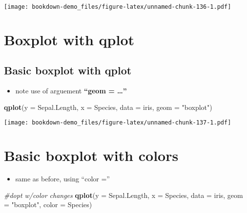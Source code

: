 \documentclass[]{book}
\newenvironment{Shaded}{\begin{snugshade}}{\end{snugshade}}
\newcommand{\KeywordTok}[1]{\textcolor[rgb]{0.13,0.29,0.53}{\textbf{#1}}}
\newcommand{\DataTypeTok}[1]{\textcolor[rgb]{0.13,0.29,0.53}{#1}}
\newcommand{\StringTok}[1]{\textcolor[rgb]{0.31,0.60,0.02}{#1}}
\newcommand{\CommentTok}[1]{\textcolor[rgb]{0.56,0.35,0.01}{\textit{#1}}}
\newcommand{\NormalTok}[1]{#1}
\providecommand{\tightlist}{%
  \setlength{\itemsep}{0pt}\setlength{\parskip}{0pt}}
\theoremstyle{definition}
\theoremstyle{definition}
\theoremstyle{definition}
\theoremstyle{remark}
\begin{document}
\texttt{[image: bookdown-demo\_files/figure-latex/unnamed-chunk-136-1.pdf]}

\section{Boxplot with qplot}\label{boxplot-with-qplot}

\subsection{Basic boxplot with qplot}\label{basic-boxplot-with-qplot}

\begin{itemize}
\tightlist
\item
  note use of arguement \textbf{``geom = \ldots{}''}
\end{itemize}

\begin{Shaded}
\begin{Highlighting}[]
\KeywordTok{qplot}\NormalTok{(}\DataTypeTok{y =}\NormalTok{ Sepal.Length,}
      \DataTypeTok{x =}\NormalTok{ Species,    }
        \DataTypeTok{data =}\NormalTok{ iris,}
      \DataTypeTok{geom =} \StringTok{"boxplot"}\NormalTok{) }
\end{Highlighting}
\end{Shaded}

\texttt{[image: bookdown-demo\_files/figure-latex/unnamed-chunk-137-1.pdf]}

\section{Basic boxplot with colors}\label{basic-boxplot-with-colors}

\begin{itemize}
\tightlist
\item
  same as before, using ``color =''
\end{itemize}

\begin{Shaded}
\begin{Highlighting}[]
\CommentTok{#dopt w/color changes}
\KeywordTok{qplot}\NormalTok{(}\DataTypeTok{y =}\NormalTok{ Sepal.Length,}
      \DataTypeTok{x =}\NormalTok{ Species,    }
        \DataTypeTok{data =}\NormalTok{ iris,}
      \DataTypeTok{geom =} \StringTok{"boxplot"}\NormalTok{,}
      \DataTypeTok{color =}\NormalTok{ Species) }
\end{Highlighting}
\end{Shaded}
\end{document}
